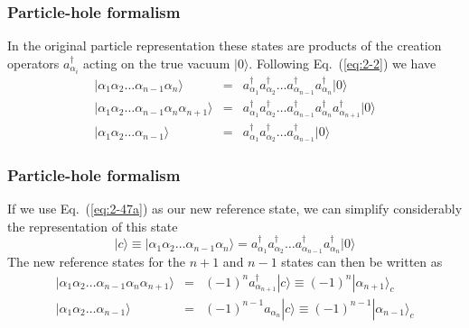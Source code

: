 \documentclass{beamer}
\begin{document}
\begin{frame}
\frametitle{Particle-hole formalism}

\begin{block}{}
In the original particle representation these states are products of the creation operators  $a_{\alpha_i}^\dagger$ acting on the true vacuum $|0\rangle $.
Following Eq.~(\ref{eq:2-2}) we have 
\begin{eqnarray}
 |\alpha_1\alpha_2\dots\alpha_{n-1}\alpha_n\rangle &=& a_{\alpha_1}^\dagger a_{\alpha_2}^\dagger \dots
					a_{\alpha_{n-1}}^\dagger a_{\alpha_n}^\dagger |0\rangle  \label{eq:2-47a} \\
	|\alpha_1\alpha_2\dots\alpha_{n-1}\alpha_n\alpha_{n+1}\rangle &=&
		a_{\alpha_1}^\dagger a_{\alpha_2}^\dagger \dots a_{\alpha_{n-1}}^\dagger a_{\alpha_n}^\dagger
		a_{\alpha_{n+1}}^\dagger |0\rangle  \label{eq:2-47b} \\
	|\alpha_1\alpha_2\dots\alpha_{n-1}\rangle &=& a_{\alpha_1}^\dagger a_{\alpha_2}^\dagger \dots
		a_{\alpha_{n-1}}^\dagger |0\rangle  \label{eq:2-47c}
\end{eqnarray}
\end{block}
\end{frame}

\begin{frame}
\frametitle{Particle-hole formalism}

\begin{block}{}
If we use Eq.~(\ref{eq:2-47a}) as our new reference state, we can simplify considerably the representation of 
this state
\begin{equation}
	|c\rangle  \equiv |\alpha_1\alpha_2\dots\alpha_{n-1}\alpha_n\rangle =
		a_{\alpha_1}^\dagger a_{\alpha_2}^\dagger \dots a_{\alpha_{n-1}}^\dagger a_{\alpha_n}^\dagger |0\rangle  \label{eq:2-48a}
\end{equation}
The new reference states for the $n+1$ and $n-1$ states can then be written as
\begin{eqnarray}
	|\alpha_1\alpha_2\dots\alpha_{n-1}\alpha_n\alpha_{n+1}\rangle &=& (-1)^n a_{\alpha_{n+1}}^\dagger |c\rangle 
		\equiv (-1)^n |\alpha_{n+1}\rangle_c \label{eq:2-48b} \\
	|\alpha_1\alpha_2\dots\alpha_{n-1}\rangle &=& (-1)^{n-1} a_{\alpha_n} |c\rangle  
		\equiv (-1)^{n-1} |\alpha_{n-1}\rangle_c \label{eq:2-48c} 
\end{eqnarray}
\end{block}
\end{frame}
\end{document}
